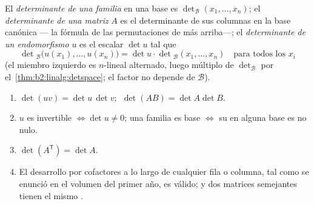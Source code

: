 \begin{definition}[Determinantes]\label{def:b2:linalg:det}
El \emph{determinante de una familia} en una base
es $\det_{\mathcal{B}}(x_1, \dots, x_n)$; el \emph{determinante de una
matriz} $A$ es el determinante de sus columnas en la base canónica ---
la fórmula de las permutaciones de más arriba---; el
\emph{determinante de un endomorfismo} $u$ es el escalar $\det u$ tal
que
\[
\det{}_{\mathcal{B}}\bigl(u(x_1), \dots, u(x_n)\bigr)
= \det u \cdot \det{}_{\mathcal{B}}(x_1, \dots, x_n)
\quad \text{para todos los } x_i
\]
(el miembro izquierdo es $n$-lineal alternado, luego múltiplo de
$\det_\mathcal{B}$ por el~\cref{thm:b2:linalg:detspace}; el factor no
depende de $\mathcal{B}$).
\end{definition}

\begin{theorem}\label{thm:b2:linalg:detrules}
\begin{enumerate}
  \item $\det(uv) = \det u\,\det v$; $\;\det(AB) = \det A \det B$.
  \item $u$ es invertible $\iff \det u \neq 0$; una familia es base
        $\iff$ su  en alguna base es no nulo.
  \item $\det(A^{\mathsf T}) = \det A$.
  \item El desarrollo por cofactores a lo largo de cualquier fila o
        columna, tal como se enunció en el volumen del primer año, es
        válido; y dos matrices semejantes tienen el mismo
        .
\end{enumerate}
\end{theorem}

